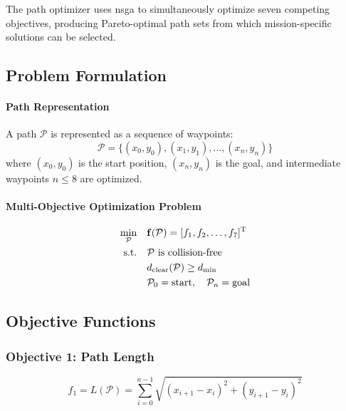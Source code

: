 The path optimizer uses \acrfull{nsga} to simultaneously optimize seven competing objectives, producing Pareto-optimal path sets from which mission-specific solutions can be selected.


\subsection{Problem Formulation}

\paragraph{Path Representation}
A path $\mathcal{P}$ is represented as a sequence of waypoints:
\begin{equation}
\mathcal{P} = \{(x_0, y_0), (x_1, y_1), \ldots, (x_n, y_n)\}
\label{eq:path_representation}
\end{equation}
where $(x_0, y_0)$ is the start position, $(x_n, y_n)$ is the goal, and intermediate waypoints $n \leq 8$ are optimized.

\paragraph{Multi-Objective Optimization Problem}
\begin{equation}
\begin{aligned}
\min_{\mathcal{P}} \quad & \mathbf{f}(\mathcal{P}) = [f_1, f_2, \ldots, f_7]^\mathrm{T} \\
\text{s.t.} \quad & \mathcal{P} \text{ is collision-free} \\
& d_{\text{clear}}(\mathcal{P}) \geq d_{\min} \\
& \mathcal{P}_0 = \text{start}, \quad \mathcal{P}_n = \text{goal}
\end{aligned}
\label{eq:moo_problem}
\end{equation}

\subsection{Objective Functions}

\subsubsection{Objective 1: Path Length}
\begin{equation}
f_1 = L(\mathcal{P}) = \sum_{i=0}^{n-1} \sqrt{(x_{i+1} - x_i)^2 + (y_{i+1} - y_i)^2}
\label{eq:obj_length}
\end{equation}

